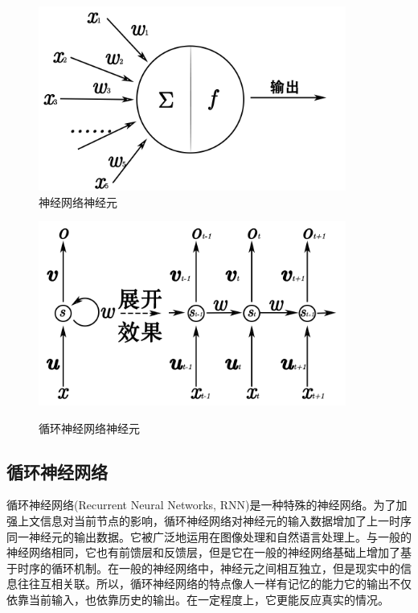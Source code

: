 \begin{figure}[b]
    \centering
    \begin{minipage}[t]{0.4\linewidth}
        \centering
        \includegraphics[width=0.9\textwidth]
        {figures/nnc.png}\\
        \caption{神经网络神经元}
        \label{fig:nnc}
    \end{minipage}
    \begin{minipage}[t]{0.5\linewidth}
        \centering
        \includegraphics[width=0.9\textwidth]
        {figures/rnnc.png}\\
        \caption{循环神经网络神经元}
        \label{fig:rnnc}
    \end{minipage}
\end{figure}

\subsection{循环神经网络}
循环神经网络(Recurrent Neural Networks, RNN)是一种特殊的神经网络。为了加强上文信息对当前节点的影响，循环神经网络对神经元的输入数据增加了上一时序同一神经元的输出数据。它被广泛地运用在图像处理和自然语言处理上。与一般的神经网络相同，它也有前馈层和反馈层，但是它在一般的神经网络基础上增加了基于时序的循环机制。在一般的神经网络中，神经元之间相互独立，但是现实中的信息往往互相关联。所以，循环神经网络的特点像人一样有记忆的能力它的输出不仅依靠当前输入，也依靠历史的输出。在一定程度上，它更能反应真实的情况。

